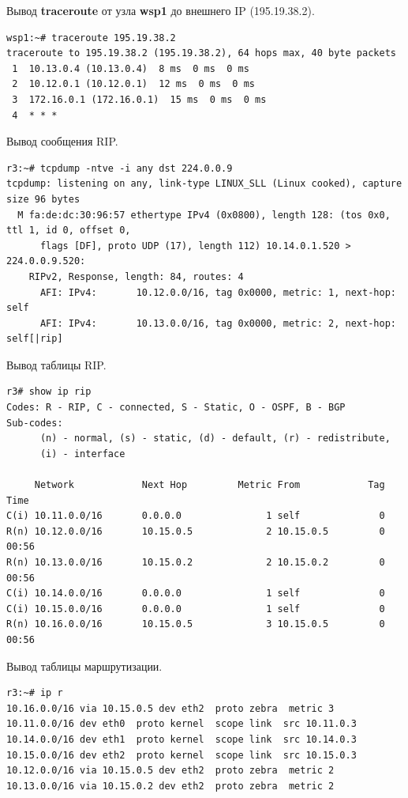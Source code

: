 \documentclass[a4paper,12pt]{article}
\begin{document}
Вывод \textbf{traceroute} от узла \textbf{wsp1} до внешнего IP (195.19.38.2).

\begin{Verbatim}
wsp1:~# traceroute 195.19.38.2
traceroute to 195.19.38.2 (195.19.38.2), 64 hops max, 40 byte packets
 1  10.13.0.4 (10.13.0.4)  8 ms  0 ms  0 ms
 2  10.12.0.1 (10.12.0.1)  12 ms  0 ms  0 ms
 3  172.16.0.1 (172.16.0.1)  15 ms  0 ms  0 ms
 4  * * *
\end{Verbatim}

Вывод сообщения RIP.

\begin{Verbatim}
r3:~# tcpdump -ntve -i any dst 224.0.0.9
tcpdump: listening on any, link-type LINUX_SLL (Linux cooked), capture size 96 bytes
  M fa:de:dc:30:96:57 ethertype IPv4 (0x0800), length 128: (tos 0x0, ttl 1, id 0, offset 0,
      flags [DF], proto UDP (17), length 112) 10.14.0.1.520 > 224.0.0.9.520: 
	RIPv2, Response, length: 84, routes: 4
	  AFI: IPv4:       10.12.0.0/16, tag 0x0000, metric: 1, next-hop: self
	  AFI: IPv4:       10.13.0.0/16, tag 0x0000, metric: 2, next-hop: self[|rip]
\end{Verbatim}

Вывод таблицы RIP.

\begin{Verbatim}
r3# show ip rip
Codes: R - RIP, C - connected, S - Static, O - OSPF, B - BGP
Sub-codes:
      (n) - normal, (s) - static, (d) - default, (r) - redistribute,
      (i) - interface

     Network            Next Hop         Metric From            Tag Time
C(i) 10.11.0.0/16       0.0.0.0               1 self              0
R(n) 10.12.0.0/16       10.15.0.5             2 10.15.0.5         0 00:56
R(n) 10.13.0.0/16       10.15.0.2             2 10.15.0.2         0 00:56
C(i) 10.14.0.0/16       0.0.0.0               1 self              0
C(i) 10.15.0.0/16       0.0.0.0               1 self              0
R(n) 10.16.0.0/16       10.15.0.5             3 10.15.0.5         0 00:56
\end{Verbatim}

Вывод таблицы маршрутизации.

\begin{Verbatim}
r3:~# ip r
10.16.0.0/16 via 10.15.0.5 dev eth2  proto zebra  metric 3 
10.11.0.0/16 dev eth0  proto kernel  scope link  src 10.11.0.3 
10.14.0.0/16 dev eth1  proto kernel  scope link  src 10.14.0.3 
10.15.0.0/16 dev eth2  proto kernel  scope link  src 10.15.0.3 
10.12.0.0/16 via 10.15.0.5 dev eth2  proto zebra  metric 2 
10.13.0.0/16 via 10.15.0.2 dev eth2  proto zebra  metric 2
\end{Verbatim}
\end{document}
